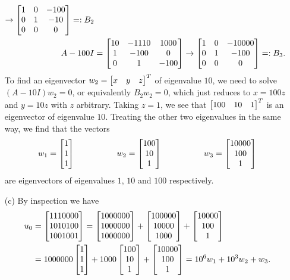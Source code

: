 \documentclass[a4paper]{amsart}
\renewenvironment{solution}{\SolutionInline}{\endSolutionInline}
\begin{document}
\begin{solution}
\begin{itemize}
\begin{align*}
            \to \left[\begin{matrix} 1 & 0 & -100 \\ 0 & 1 & -10 \\ 0 & 0 & 0 \end{matrix}\right] =: B_2\\
    A-100I &= \left[\begin{matrix} 10 & -1110 & 1000 \\ 1 & -100 & 0 \\ 0 & 1 & -100 \end{matrix}\right] 
            \to \left[\begin{matrix} 1 & 0 & -10000 \\ 0 & 1 & -100 \\ 0 & 0 & 0 \end{matrix}\right] =: B_3.
   \end{align*}
   To find an eigenvector $w_2=\left[\begin{matrix} x & y & z\end{matrix}\right]^T$ of eigenvalue
   $10$, we need to solve $(A-10I)w_2=0$, or equivalently $B_2w_2=0$,
   which just reduces to $x=100z$ and $y=10z$ with $z$ arbitrary.
   Taking $z=1$, we see that $\left[\begin{matrix} 100 & 10 & 1\end{matrix}\right]^T$ is an
   eigenvector of eigenvalue $10$.  Treating the other two eigenvalues
   in the same way, we find that the vectors
   \[ w_1 = \left[\begin{matrix} 1 \\ 1 \\ 1 \end{matrix}\right] \hspace{5em}
      w_2 = \left[\begin{matrix} 100 \\ 10 \\ 1 \end{matrix}\right] \hspace{5em}
      w_3 = \left[\begin{matrix} 10000 \\ 100 \\ 1 \end{matrix}\right]
   \]
   are eigenvectors of eigenvalues $1$, $10$ and $100$ respectively.
  \item[(c)] By inspection we have
   \begin{align*}
    u_0 &= \left[\begin{matrix} 1110000 \\ 1010100 \\ 1001001\end{matrix}\right] 
       = \left[\begin{matrix} 1000000 \\ 1000000 \\ 1000000\end{matrix}\right] +
         \left[\begin{matrix}  100000 \\   10000 \\    1000\end{matrix}\right] +
         \left[\begin{matrix}   10000 \\     100 \\       1\end{matrix}\right]  \\
      &= 1000000 \left[\begin{matrix} 1 \\ 1 \\ 1\end{matrix}\right] +
         1000 \left[\begin{matrix} 100 \\ 10 \\ 1\end{matrix}\right] +
         \left[\begin{matrix} 10000 \\ 100 \\ 1\end{matrix}\right] 
       = 10^6 w_1 + 10^3 w_2 + w_3.
   \end{align*}

\end{itemize}
\end{solution}
\end{document}
